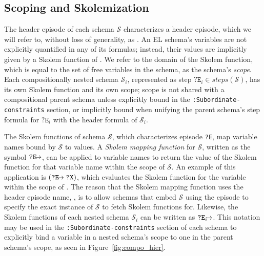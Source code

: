 \subsection{Scoping and Skolemization}
\label{sec:scoping}
The header episode of each schema $\mathcal{S}$ characterizes a header episode, which we will refer to, without loss of generality, as . An EL schema's variables are not explicitly quantified in any of its formulas; instead, their values are implicitly given by a Skolem function of . We refer to the domain of the Skolem function, which is equal to the set of free variables in the schema, as the schema's \textit{scope}. Each compositionally nested schema $\mathcal{S}_{i}$, represented as step $\texttt{?E}_{i} \in steps(\mathcal{S})$, has its own Skolem function and its own scope; scope is not shared with a compositional parent schema unless explicitly bound in the \texttt{:Subordinate-constraints} section, or implicitly bound when unifying the parent schema's step formula for $\texttt{?E}_{i}$ with the header formula of $\mathcal{S}_{i}$.

The Skolem functions of schema $\mathcal{S}$, which characterizes episode \texttt{?E}, map variable names bound by $\mathcal{S}$ to values.
A \textit{Skolem mapping function} for $\mathcal{S}$, written as the symbol $\texttt{?E}\hspace{-2mm}\rightarrow$, can be applied to variable names to return the value of the Skolem function for that variable name within the scope of $\mathcal{S}$.
An example of this application is $(\texttt{?E}\hspace{-2mm}\rightarrow \el{?X})$, which evaluates the Skolem function for the variable  within the scope of .
The reason that the Skolem mapping function uses the header episode name, , is to allow schemas that embed $\mathcal{S}$ using the episode  to specify the exact instance of $\mathcal{S}$ to fetch Skolem functions for.
Likewise, the Skolem functions of each nested schema $\mathcal{S}_{i}$ can be written as $\texttt{?E}_{i}\hspace{-2mm}\rightarrow$. This notation may be used in the \texttt{:Subordinate-constraints} section of each schema to explicitly bind a variable in a nested schema's scope to one in the parent schema's scope, as seen in Figure~\ref{fig:compo_hier}.
